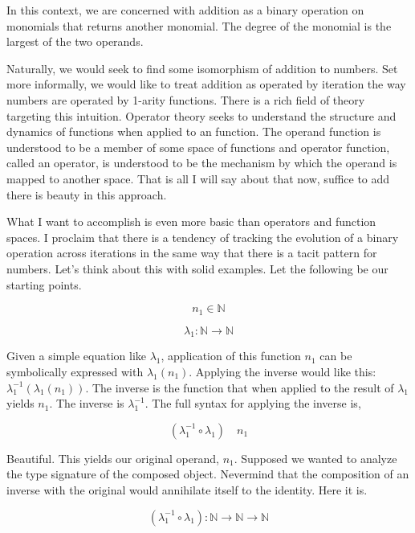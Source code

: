 \documentclass[12pt]{article}
\begin{document}
In this context, we are concerned with addition as a binary operation on
monomials that returns another monomial. The degree of the monomial is the
largest of the two operands.

Naturally, we would seek to find some isomorphism of addition to numbers. Set
more informally, we would like to treat addition as operated by iteration the
way numbers are operated by 1-arity functions. There is a rich field of theory
targeting this intuition. Operator theory seeks to understand the structure and
dynamics of functions when applied to an function. The operand function is
understood to be a member of some space of functions and operator function,
called an operator, is understood to be the mechanism by which the operand is
mapped to another space. That is all I will say about that now, suffice to add
there is beauty in this approach.

What I want to accomplish is even more basic than operators and function
spaces. I proclaim that there is a tendency of tracking the evolution of a
binary operation across iterations in the same way that there is a tacit
pattern for numbers. Let's think about this with solid examples. Let the
following be our starting points.

\begin{equation}
    n_1 \in \mathbb{N}
\end{equation}

\begin{equation}
    \lambda_1: \mathbb{N} \rightarrow \mathbb{N}
\end{equation}

Given a simple equation like $\lambda_1$, application of this function $n_1$
can be symbolically expressed with $\lambda_1(n_1)$. Applying the inverse would
like this: $\lambda_1^{-1}(\lambda_1(n_1))$. The inverse is the function that
when applied to the result of $\lambda_1$ yields $n_1$. The inverse is
$\lambda_1^{-1}$. The full syntax for applying the inverse is,

\begin{equation}
    (\lambda_1^{-1} \circ \lambda_1) \quad n_1
\end{equation}

Beautiful. This yields our original operand, $n_1$. Supposed we wanted to
analyze the type signature of the composed object. Nevermind that the
composition of an inverse with the original would annihilate itself to the
identity. Here it is.

\begin{equation}
    (\lambda_1^{-1} \circ \lambda_1): \mathbb{N} \rightarrow \mathbb{N} \rightarrow \mathbb{N}
    \label{eq:comp}
\end{equation}
\end{document}
